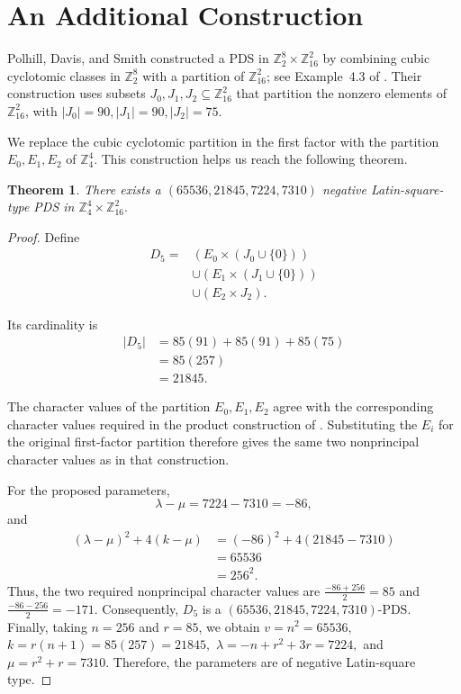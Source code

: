 \documentclass[11pt]{article}
\newtheorem{theorem}{Theorem}[section]
\theoremstyle{definition}
\theoremstyle{remark}
\newcommand{\Z}{\mathbb{Z}}
\begin{document}

\section{An Additional Construction}
\label{sec:other}

Polhill, Davis, and Smith constructed a PDS in $\Z_2^8\times\Z_{16}^2$
by combining cubic cyclotomic classes in \(\Z_2^8\) with a partition
of \(\Z_{16}^2\); see Example~4.3 of
\cite{polhillDavisSmith2013}. Their construction uses subsets $J_0,J_1,J_2\subseteq\Z_{16}^2$
that partition the nonzero elements of \(\Z_{16}^2\), with $|J_0|=90, |J_1|=90, |J_2|=75.$

We replace the cubic cyclotomic partition in the first factor with the partition $E_0,E_1,E_2$
of \(\Z_4^4\). This construction helps us reach the following theorem. 

\begin{theorem}
\label{thm:secondMain}
There exists a $(65536,21845,7224,7310)$
negative Latin-square-type PDS in
$\Z_4^4\times\Z_{16}^2.$
\end{theorem}

\begin{proof}
Define
\[
\begin{aligned}
D_5
={}&
\left(E_0\times(J_0\cup\{0\})\right)
\\
&\cup
\left(E_1\times(J_1\cup\{0\})\right)
\\
&\cup
\left(E_2\times J_2\right).
\end{aligned}
\]

Its cardinality is
\[
\begin{aligned}
|D_5|
&=
85(91)+85(91)+85(75)
\\
&=
85(257)
\\
&=
21845.
\end{aligned}
\]

The character values of the partition \(E_0,E_1,E_2\) agree with
the corresponding character values required in the product
construction of \cite{polhillDavisSmith2013}. Substituting the
\(E_i\) for the original first-factor partition therefore gives the
same two nonprincipal character values as in that construction.

For the proposed parameters,
\[
\lambda-\mu
=
7224-7310
=
-86,
\]
and
\[
\begin{aligned}
(\lambda-\mu)^2+4(k-\mu)
&=
(-86)^2+4(21845-7310)
\\
&=
65536
\\
&=
256^2.
\end{aligned}
\]
Thus, the two required nonprincipal character values are $\frac{-86+256}{2}=85$ and $\frac{-86-256}{2}=-171.$ Consequently, \(D_5\) is a $(65536,21845,7224,7310)\text{-PDS}.$\\

Finally, taking $n=256$ and $r=85$, we obtain $v=n^2=65536,$ $k=r(n+1)=85(257)=21845,$
$\lambda=-n+r^2+3r=7224,$ and $\mu=r^2+r=7310.$
Therefore, the parameters are of negative Latin-square type.
\end{proof}
\end{document}
